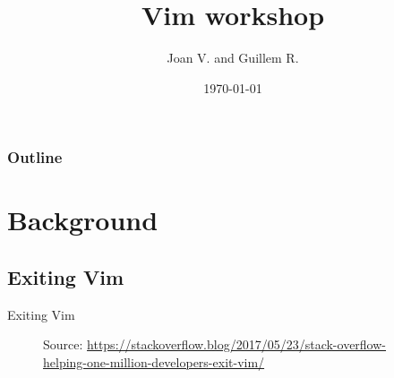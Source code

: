 \documentclass{beamer}
\title[Vim workshop]{Vim workshop}
\author{Joan V. and Guillem R.}
\institute[LinuxUPC]
{
  LinuxUPC \\
  \medskip
  \textit{linuxupc AT linuxupc.upc.edu} 
}
\date{\today}
\begin{document}
\begin{frame}
  \titlepage
\end{frame}

\begin{frame}
  \frametitle{Outline} 
  \tableofcontents 
\end{frame}

\section{Background}
\subsection{Exiting Vim}
\begin{frame}{Exiting Vim}
  \begin{figure}[htp] 
    \centering
      \hfill%
        \caption{Source: \url{https://stackoverflow.blog/2017/05/23/stack-overflow-helping-one-million-developers-exit-vim/}}
  \end{figure}
\end{frame}
\end{document}
